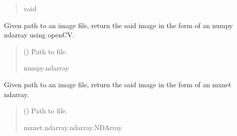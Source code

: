 \documentclass[letterpaper,10pt,english]{sphinxmanual}
\begin{document}
\begin{fulllineitems}
\begin{fulllineitems}
\begin{quote}
\begin{description}
\sphinxAtStartPar
void

\end{description}\end{quote}

\end{fulllineitems}


\begin{fulllineitems}
\label{\detokenize{comp_viz.utils:comp_viz.utils.toolbox.Tools.get_cv2_image}}
\pysigstartsignatures
{}
\pysigstopsignatures
\sphinxAtStartPar
Given path to an image file, return the said image in the form of an numpy ndarray using openCV.
\begin{quote}\begin{description}
\sphinxAtStartPar
{} () \textendash{} Path to file.

\sphinxAtStartPar
numpy.ndarray

\end{description}\end{quote}

\end{fulllineitems}


\begin{fulllineitems}
\label{\detokenize{comp_viz.utils:comp_viz.utils.toolbox.Tools.get_mxnet_image}}
\pysigstartsignatures
{}
\pysigstopsignatures
\sphinxAtStartPar
Given path to an image file, return the said image in the form of an mxnet ndarray.
\begin{quote}\begin{description}
\sphinxAtStartPar
{} () \textendash{} Path to file.

\sphinxAtStartPar
mxnet.ndarray.ndarray.NDArray


\end{description}
\end{quote}
\end{fulllineitems}
\end{fulllineitems}
\end{document}
